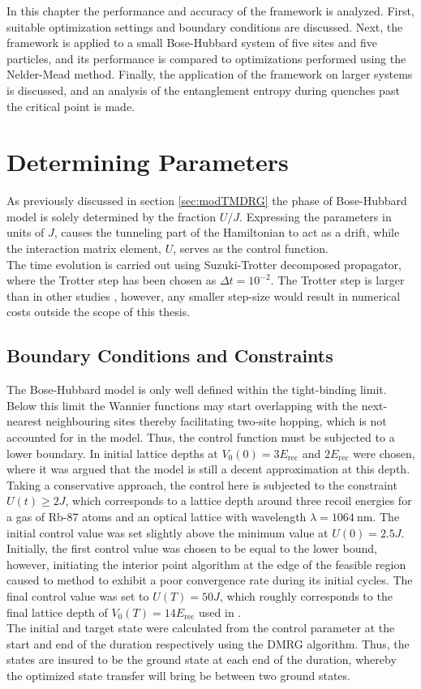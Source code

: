 In this chapter the performance and accuracy of the framework is analyzed. First, suitable optimization settings and boundary conditions are discussed.
Next, the framework is applied to a small Bose-Hubbard system of five sites and five particles, and its performance is compared to optimizations performed using the Nelder-Mead method.
Finally, the application of the framework on larger systems is discussed, and an analysis of the entanglement entropy during quenches past the critical point is made. 


\section{Determining Parameters}

As previously discussed in section \ref{sec:modTMDRG} the phase of Bose-Hubbard model is solely determined by the fraction $U/J$. Expressing the parameters in units of $J$, causes the tunneling part of the Hamiltonian to act as a drift, while the interaction matrix element, $U$, serves as the control function.\\
The time evolution is carried out using Suzuki-Trotter decomposed propagator, where the Trotter step has been chosen as $\Delta t = 10^{-2}$. The Trotter step is larger than in other studies \cite{Doria2011,FrankBloch,Braun2015}, however, any smaller step-size would result in numerical costs outside the scope of this thesis.


\subsection{Boundary Conditions and Constraints}
The Bose-Hubbard model is only well defined within the tight-binding limit. Below this limit the Wannier functions may start overlapping with the next-nearest neighbouring sites thereby facilitating two-site hopping, which is not accounted for in the model. Thus, the control function must be subjected to a lower boundary. In \cite{FrankBloch,Doria2011} initial lattice depths at $V_0 (0) = 3 E_{\mathrm{rec}}$ and $2 E_{\mathrm{rec}}$ were chosen, where it was argued that the model is still a decent approximation at this depth.
Taking a conservative approach, the control here is subjected to the constraint $U (t) \geq 2 J$, which corresponds to a lattice depth around three recoil energies for a gas of Rb-87 atoms and an optical lattice with wavelength $\lambda = 1064 \: \mathrm{nm}$. 
The initial control value was set slightly above the minimum value at $U (0) = 2.5 J$. Initially, the first control value was chosen to be equal to the lower bound, however, initiating the interior point algorithm at the edge of the feasible region caused to method to exhibit a poor convergence rate during its initial cycles.
The final control value was set to $U (T) = 50 J$, which roughly corresponds to the final lattice depth of $V_0 (T) = 14 E_{\mathrm{rec}}$ used in \cite{FrankBloch}.\\
The initial and target state were calculated from the control parameter at the start and end of the duration respectively using the DMRG algorithm. Thus, the states are insured to be the ground state at each end of the duration, whereby the optimized state transfer will bring be between two ground states.



